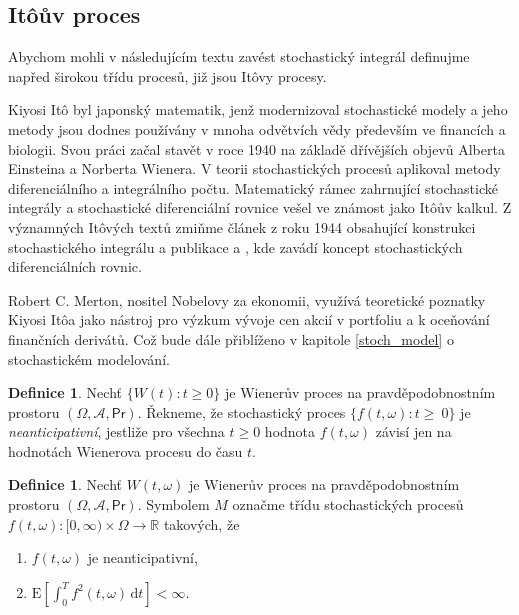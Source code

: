 \documentclass[a4paper,12pt]{report}
\theoremstyle{definition} \newtheorem{definice}[veta]{Definice}
\theoremstyle{remark}
\begin{document}
\subsection{It\^oův proces}
Abychom mohli v následujícím textu zavést stochastický integrál definujme napřed širokou třídu procesů, již jsou It\^ovy procesy.

Kiyosi It\^o byl japonský matematik, jenž modernizoval stochastické modely a jeho metody jsou dodnes používány v mnoha odvětvích vědy především ve financích a biologii.
Svou práci začal stavět v roce 1940 na základě dřívějších objevů Alberta Einsteina a Norberta Wienera.
V teorii stochastických procesů aplikoval metody diferenciálního a integrálního počtu.
Matematický rámec zahrnující stochastické integrály a stochastické diferenciální rovnice vešel ve známost jako It\^oův kalkul.
Z významných It\^ových textů zmiňme 
článek \cite{ito1944} z roku 1944 obsahující konstrukci stochastického integrálu
a publikace \cite{ito1946} a
\cite{ito1951stochastic}, kde zavádí koncept stochastických diferenciálních rovnic.

Robert C. Merton, nositel Nobelovy za ekonomii, využívá teoretické poznatky Kiyosi It\^oa jako nástroj pro výzkum vývoje cen akcií v portfoliu a k oceňování finančních derivátů.
Což bude dále přiblíženo v kapitole \ref{stoch_model} o stochastickém modelování.

\begin{definice}
Nechť $\{W(t):t\ge0\}$ je Wienerův proces na pravděpodobnostním prostoru $(\Omega,\mathcal{A},\mathsf{Pr})$.
Řekneme, že stochastický proces $\{f(t,\omega):t\ge~0\}$ je \textit{neanticipativní}, jestliže pro všechna $t\ge0$ hodnota $f(t,\omega)$ závisí jen na hodnotách Wienerova procesu do času $t$.
\end{definice}

\begin{definice}\label{M}
Nechť $W(t,\omega)$ je Wienerův proces na pravděpodobnostním prostoru $(\Omega,\mathcal{A},\mathsf{Pr})$.
Symbolem $M$ označme třídu stochastických procesů \linebreak$f(t,\omega):[0,\infty)\times\Omega\to\mathbb R$ takových, že
\begin{enumerate}
\item[1.] $f(t,\omega)$ je neanticipativní, 
\item[2.] $\text{E}\left[\int_0^Tf^2(t,\omega)\,\mathrm{d}t\right]<\infty.$ 
\end{enumerate}
\end{definice}
\end{document}
